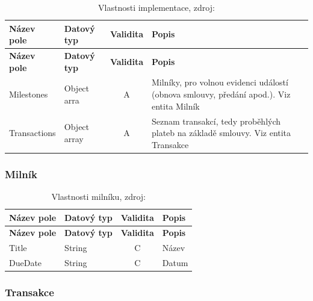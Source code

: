 \begin{center}
\begin{longtable}{lp{20mm}cp{65mm}}
\label{grid_mlmmh} \\
\multicolumn{1}{l}{\textbf{Název pole}} & 
\multicolumn{1}{l}{\textbf{Datový typ}} & 
\multicolumn{1}{l}{\textbf{Validita}} & 
\multicolumn{1}{l}{\textbf{Popis}} \\ \hline 
\endfirsthead
\multicolumn{1}{l}{\textbf{Název pole}} & 
\multicolumn{1}{l}{\textbf{Datový typ}} & 
\multicolumn{1}{l}{\textbf{Validita}} & 
\multicolumn{1}{l}{\textbf{Popis}} \\ \hline 
\hline
\endhead
\endfoot
\caption[Vlastnosti implementace]{Vlastnosti implementace, zdroj:\cite{metodika, standard}}
\endlastfoot
\rowcolor{validateA}Milestones & Object arra & A & Milníky, pro volnou evidenci událostí (obnova smlouvy, předání apod.). Viz entita Milník \\
\rowcolor{validateA}Transactions & Object array & A & Seznam transakcí, tedy proběhlých plateb na základě smlouvy. Viz entita Transakce \\
\end{longtable}
\end{center}

\subsubsection*{Milník}

\begin{center}
\begin{longtable}{lp{20mm}cp{65mm}}
\label{grid_mlmmh} \\
\multicolumn{1}{l}{\textbf{Název pole}} & 
\multicolumn{1}{l}{\textbf{Datový typ}} & 
\multicolumn{1}{l}{\textbf{Validita}} & 
\multicolumn{1}{l}{\textbf{Popis}} \\ \hline 
\endfirsthead
\multicolumn{1}{l}{\textbf{Název pole}} & 
\multicolumn{1}{l}{\textbf{Datový typ}} & 
\multicolumn{1}{l}{\textbf{Validita}} & 
\multicolumn{1}{l}{\textbf{Popis}} \\ \hline 
\hline
\endhead
\endfoot
\caption[Vlastnosti milníku]{Vlastnosti milníku, zdroj:\cite{metodika, standard}}
\endlastfoot
\rowcolor{validateC}Title & String & C & Název \\
\rowcolor{validateC}DueDate & String & C & Datum \\
\end{longtable}
\end{center}

\subsubsection*{Transakce}

